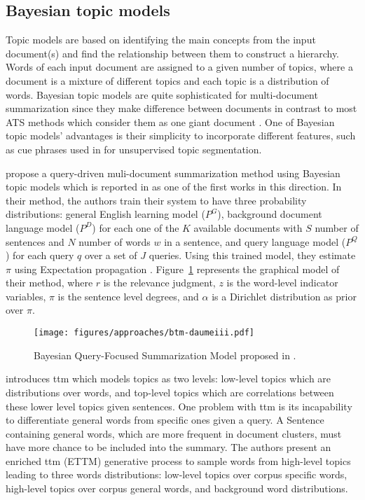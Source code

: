 \subsection{Bayesian topic models}

Topic models are based on identifying the main concepts from the input document(s) and find the relationship between them to construct a hierarchy. 
Words of each input document are assigned to a given number of topics, where a document is a mixture of different topics and each topic is a distribution of words. 
Bayesian topic models are quite sophisticated for multi-document summarization since they make difference between documents in contrast to most ATS methods which consider them as one giant document \citep{11-nenkova-mckeown}.
One of Bayesian topic models' advantages is their simplicity to incorporate different features, such as cue phrases used in \citep{08-eisenstein-barzilay} for unsupervised topic segmentation.


\citet{06-daumeiii-marcu} propose a query-driven muli-document summarization method using Bayesian topic models which is reported in \citep{11-nenkova-mckeown} as one of the first works in this direction.
In their method, the authors train their system to have three probability distributions: general English learning model ($ P^G $), background document language model ($ P^D $) for each one of the $ K $ available documents with $ S $ number of sentences and $ N $ number of words $ w $ in a sentence, and query language model ($ P^Q $) for each query $ q $ over a set of $ J $ queries.
Using this trained model, they estimate $ \pi $ using Expectation propagation \citep{01-minka}.
Figure~\ref{fig:btm-daumeiii} represents the graphical model of their method, where $ r $ is the relevance judgment,  $ z $ is the word-level indicator variables, $ \pi $ is the sentence level degrees, and $ \alpha $ is a Dirichlet distribution as prior over $ \pi $.
\begin{figure}[ht]
	\begin{center}
		\texttt{[image: figures/approaches/btm-daumeiii.pdf]} %
		\caption{Bayesian Query-Focused Summarization Model proposed in \citep{06-daumeiii-marcu}.}
		\label{fig:btm-daumeiii}
	\end{center}
\end{figure}


\citet{11-celikyilmaz-hakkani} introduces \ac{ttm} which models topics as two levels: low-level topics which are distributions over words, and top-level topics which are correlations between these lower level topics given sentences.
One problem with \ac{ttm} is its incapability to differentiate general words from specific ones given a query. 
A Sentence containing general words, which are more frequent in document clusters, must have more chance to be included into the summary. 
The authors present an enriched \ac{ttm} (ETTM) generative process to sample words from high-level topics leading to three words distributions: low-level topics over corpus specific words, high-level topics over corpus general words, and background word distributions.

